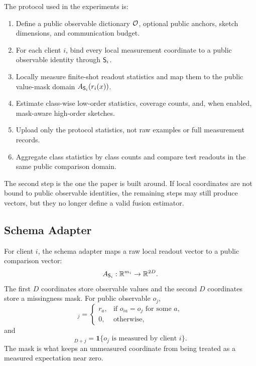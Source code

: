 The protocol used in the experiments is:
\begin{enumerate}
    \item Define a public observable dictionary \(\mathcal{O}\), optional public anchors, sketch dimensions, and communication budget.
    \item For each client \(i\), bind every local measurement coordinate to a public observable identity through \(\mathsf{S}_i\).
    \item Locally measure finite-shot readout statistics and map them to the public value-mask domain \(A_{\mathsf{S}_i}(r_i(x))\).
    \item Estimate class-wise low-order statistics, coverage counts, and, when enabled, mask-aware high-order sketches.
    \item Upload only the protocol statistics, not raw examples or full measurement records.
    \item Aggregate class statistics by class counts and compare test readouts in the same public comparison domain.
\end{enumerate}
The second step is the one the paper is built around. If local coordinates are not bound to public observable identities, the remaining steps may still produce vectors, but they no longer define a valid fusion estimator.

\subsection{Schema Adapter}

For client \(i\), the schema adapter maps a raw local readout vector to a public comparison vector:
\begin{equation}
    A_{\mathsf{S}_i}: \mathbb{R}^{m_i}\rightarrow \mathbb{R}^{2D}.
\end{equation}
The first \(D\) coordinates store observable values and the second \(D\) coordinates store a missingness mask. For public observable \(o_j\),
\begin{equation}
    [A_{\schema_i}(r)]_j =
    \begin{cases}
        r_a, & \text{if } o_{ia}=o_j \text{ for some } a,\\
        0, & \text{otherwise},
    \end{cases}
\end{equation}
and
\begin{equation}
    [A_{\schema_i}(r)]_{D+j} =
    \mathbf{1}\{o_j \text{ is measured by client } i\}.
\end{equation}
The mask is what keeps an unmeasured coordinate from being treated as a measured expectation near zero.

